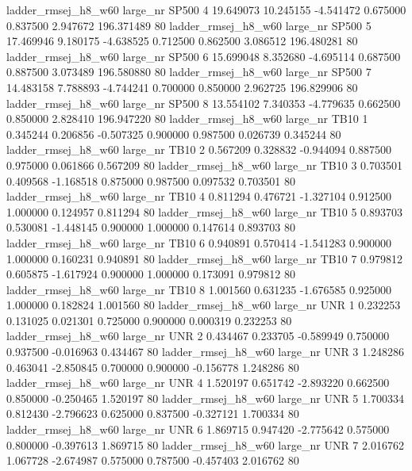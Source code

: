 ladder_rmsej_h8_w60   large_nr    SP500                 4 19.649073 10.245155  -4.541472 0.675000 0.837500  2.947672  196.371489 80
ladder_rmsej_h8_w60   large_nr    SP500                 5 17.469946  9.180175  -4.638525 0.712500 0.862500  3.086512  196.480281 80
ladder_rmsej_h8_w60   large_nr    SP500                 6 15.699048  8.352680  -4.695114 0.687500 0.887500  3.073489  196.580880 80
ladder_rmsej_h8_w60   large_nr    SP500                 7 14.483158  7.788893  -4.744241 0.700000 0.850000  2.962725  196.829906 80
ladder_rmsej_h8_w60   large_nr    SP500                 8 13.554102  7.340353  -4.779635 0.662500 0.850000  2.828410  196.947220 80
ladder_rmsej_h8_w60   large_nr     TB10                 1  0.345244  0.206856  -0.507325 0.900000 0.987500  0.026739    0.345244 80
ladder_rmsej_h8_w60   large_nr     TB10                 2  0.567209  0.328832  -0.944094 0.887500 0.975000  0.061866    0.567209 80
ladder_rmsej_h8_w60   large_nr     TB10                 3  0.703501  0.409568  -1.168518 0.875000 0.987500  0.097532    0.703501 80
ladder_rmsej_h8_w60   large_nr     TB10                 4  0.811294  0.476721  -1.327104 0.912500 1.000000  0.124957    0.811294 80
ladder_rmsej_h8_w60   large_nr     TB10                 5  0.893703  0.530081  -1.448145 0.900000 1.000000  0.147614    0.893703 80
ladder_rmsej_h8_w60   large_nr     TB10                 6  0.940891  0.570414  -1.541283 0.900000 1.000000  0.160231    0.940891 80
ladder_rmsej_h8_w60   large_nr     TB10                 7  0.979812  0.605875  -1.617924 0.900000 1.000000  0.173091    0.979812 80
ladder_rmsej_h8_w60   large_nr     TB10                 8  1.001560  0.631235  -1.676585 0.925000 1.000000  0.182824    1.001560 80
ladder_rmsej_h8_w60   large_nr      UNR                 1  0.232253  0.131025   0.021301 0.725000 0.900000  0.000319    0.232253 80
ladder_rmsej_h8_w60   large_nr      UNR                 2  0.434467  0.233705  -0.589949 0.750000 0.937500 -0.016963    0.434467 80
ladder_rmsej_h8_w60   large_nr      UNR                 3  1.248286  0.463041  -2.850845 0.700000 0.900000 -0.156778    1.248286 80
ladder_rmsej_h8_w60   large_nr      UNR                 4  1.520197  0.651742  -2.893220 0.662500 0.850000 -0.250465    1.520197 80
ladder_rmsej_h8_w60   large_nr      UNR                 5  1.700334  0.812430  -2.796623 0.625000 0.837500 -0.327121    1.700334 80
ladder_rmsej_h8_w60   large_nr      UNR                 6  1.869715  0.947420  -2.775642 0.575000 0.800000 -0.397613    1.869715 80
ladder_rmsej_h8_w60   large_nr      UNR                 7  2.016762  1.067728  -2.674987 0.575000 0.787500 -0.457403    2.016762 80
